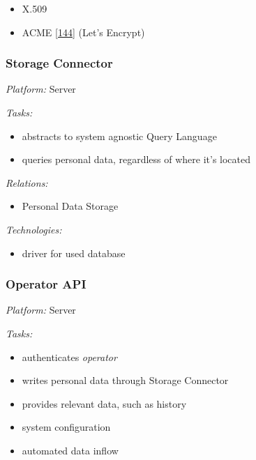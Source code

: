 \documentclass[12pt,english,a4paper,titlepage,cleardoublepage=empty,dottedtoc]{report}
\providecommand{\tightlist}{%
  \setlength{\itemsep}{0pt}\setlength{\parskip}{0pt}}
\begin{document}
\begin{itemize}
\tightlist
\item
  X.509
\item
  ACME {[}\protect\hyperlink{ref-web_spec_acme}{144}{]} (Let's Encrypt)
\end{itemize}

\subsubsection*{Storage Connector}\label{storage-connector}

\emph{Platform:} Server

\emph{Tasks:}

\begin{itemize}
\tightlist
\item
  abstracts to system agnostic Query Language
\item
  queries personal data, regardless of where it's located
\end{itemize}

\emph{Relations:}

\begin{itemize}
\tightlist
\item
  Personal Data Storage
\end{itemize}

\emph{Technologies:}

\begin{itemize}
\tightlist
\item
  driver for used database
\end{itemize}

\subsubsection*{Operator API}\label{operator-api}

\emph{Platform:} Server

\emph{Tasks:}

\begin{itemize}
\tightlist
\item
  authenticates \emph{operator}
\item
  writes personal data through Storage Connector
\item
  provides relevant data, such as history
\item
  system configuration
\item
  automated data inflow
\end{itemize}
\end{document}
